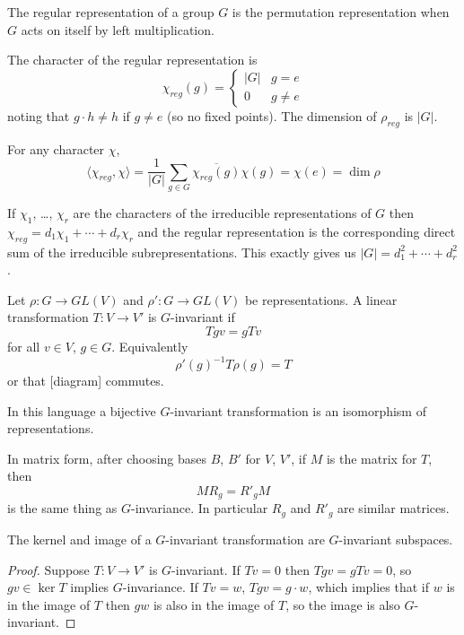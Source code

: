\documentclass[10pt]{scrartcl}
\providecommand{\ol}{\overline}
\providecommand{\inv}{^{-1}}
\begin{document}
\begin{definition}
	The regular representation of a group $G$ is the permutation representation
	when $G$ acts on itself by left multiplication.
\end{definition}
The character of the regular representation is
\[\chi_{reg}(g) = \begin{cases}
	|G| & g=e\\
	0 & g\ne e
\end{cases}\]
noting that $g\cdot h\ne h$ if $g\ne e$ (so no fixed points).
The dimension of $\rho_{reg}$ is $|G|$.

For any character $\chi$,
\[\langle\chi_{reg}, \chi\rangle = \frac{1}{|G|}\sum_{g\in G}\ol{\chi_{reg}(g)}\chi(g) = \chi(e) = \dim\rho\]

\begin{corollary}
	If $\chi_1$, \dots, $\chi_r$ are the characters of the irreducible
	representations of $G$ then $\chi_{reg} = d_1\chi_1 + \cdots + d_r\chi_r$
	and the regular representation is the corresponding
	direct sum of the irreducible subrepresentations.
	This exactly gives us $|G| = d_1^2 + \cdots + d_r^2$.
\end{corollary}

\begin{definition}
	Let $\rho\colon G\to GL(V)$ and $\rho'\colon G\to GL(V)$ be representations.
	A linear transformation $T\colon V\to V'$ is $G$-invariant if
	\[Tgv = gTv\]
	for all $v\in V$, $g\in G$.
	Equivalently
	\[\rho'(g)\inv T\rho(g) = T\]
	or that [diagram] commutes.
\end{definition}

In this language a bijective $G$-invariant transformation is
an isomorphism of representations.

In matrix form, after choosing bases $B$, $B'$ for $V$, $V'$,
if $M$ is the matrix for $T$, then
\[MR_g = R'_gM\]
is the same thing as $G$-invariance. In particular $R_g$ and $R'_g$
are similar matrices.

\begin{lemma}
	The kernel and image of a $G$-invariant transformation are
	$G$-invariant subspaces.
\end{lemma}

\begin{proof}
	Suppose $T\colon V\to V'$ is $G$-invariant.
	If $Tv = 0$ then $Tgv = gTv = 0$, so $gv\in\ker T$ implies $G$-invariance.
	If $Tv = w$, $Tgv = g\cdot w$, which implies that
	if $w$ is in the image of $T$ then $gw$ is also in the image of $T$,
	so the image is also $G$-invariant.
\end{proof}
\end{document}
